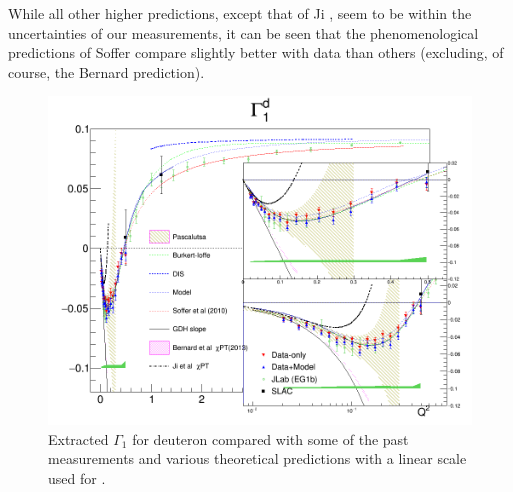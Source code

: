 While all other higher \qsqs predictions, except that of Ji \etalns, seem to be within the uncertainties of our measurements, it can be seen that the phenomenological predictions of Soffer \etal compare slightly better with data than others (excluding, of course, the Bernard \etal prediction).




\begin{figure}[H] %
  \centering
  \leavevmode \includegraphics[width=1.2\textwidth]{figuresEG4/FigResults/integralsFromCombinedG1nA1F1_Wbins70Gm1WdInset2.png} 
  \caption[$\Gamma^d_1$ (linear scale).]{Extracted $\Gamma_1$ for deuteron compared with some of the past measurements and various theoretical predictions  with a linear scale used for \qsq. }
  \label{Gamma1Low}  
\end{figure}

